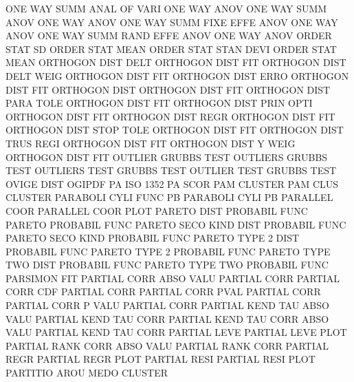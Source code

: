 ONE      WAY  SUMM ANAL OF   VARI       ONE      WAY  ANOV
ONE      WAY  SUMM ANOV                 ONE      WAY  ANOV
ONE      WAY  SUMM FIXE EFFE ANOV       ONE      WAY  ANOV
ONE      WAY  SUMM RAND EFFE ANOV       ONE      WAY  ANOV
ORDER    STAT SD                        ORDER    STAT MEAN
ORDER    STAT STAN DEVI                 ORDER    STAT MEAN
ORTHOGON DIST DELT                      ORTHOGON DIST FIT
ORTHOGON DIST DELT WEIG                 ORTHOGON DIST FIT
ORTHOGON DIST ERRO                      ORTHOGON DIST FIT
ORTHOGON DIST                           ORTHOGON DIST FIT
ORTHOGON DIST PARA TOLE                 ORTHOGON DIST FIT
ORTHOGON DIST PRIN OPTI                 ORTHOGON DIST FIT
ORTHOGON DIST REGR                      ORTHOGON DIST FIT
ORTHOGON DIST STOP TOLE                 ORTHOGON DIST FIT
ORTHOGON DIST TRUS REGI                 ORTHOGON DIST FIT
ORTHOGON DIST Y    WEIG                 ORTHOGON DIST FIT
OUTLIER                                 GRUBBS   TEST
OUTLIERS                                GRUBBS   TEST
OUTLIERS TEST                           GRUBBS   TEST
OUTLIER  TEST                           GRUBBS   TEST
OVIGE    DIST                           OGIPDF
PA                                      ISO      1352 PA   SCOR
PAM                                     CLUSTER
PAM      CLUS                           CLUSTER
PARABOLI CYLI FUNC                      PB
PARABOLI CYLI                           PB
PARALLEL COOR                           PARALLEL COOR PLOT
PARETO   DIST                           PROBABIL FUNC
PARETO                                  PROBABIL FUNC
PARETO   SECO KIND DIST                 PROBABIL FUNC
PARETO   SECO KIND                      PROBABIL FUNC
PARETO   TYPE 2    DIST                 PROBABIL FUNC
PARETO   TYPE 2                         PROBABIL FUNC
PARETO   TYPE TWO  DIST                 PROBABIL FUNC
PARETO   TYPE TWO                       PROBABIL FUNC
PARSIMON                                FIT
PARTIAL  CORR ABSO VALU                 PARTIAL  CORR
PARTIAL  CORR CDF                       PARTIAL  CORR
PARTIAL  CORR PVAL                      PARTIAL  CORR
PARTIAL  CORR P    VALU                 PARTIAL  CORR
PARTIAL  KEND TAU  ABSO VALU            PARTIAL  KEND TAU  CORR
PARTIAL  KEND TAU  CORR ABSO VALU       PARTIAL  KEND TAU  CORR
PARTIAL  LEVE                           PARTIAL  LEVE PLOT
PARTIAL  RANK CORR ABSO VALU            PARTIAL  RANK CORR
PARTIAL  REGR                           PARTIAL  REGR PLOT
PARTIAL  RESI                           PARTIAL  RESI PLOT
PARTITIO AROU MEDO                      CLUSTER

